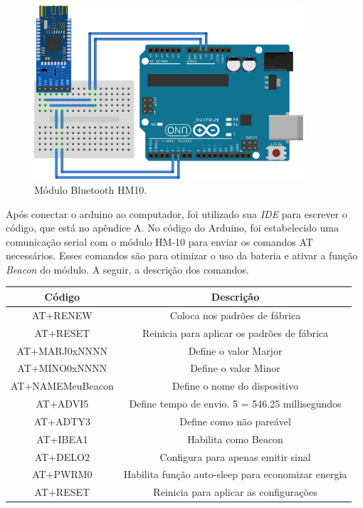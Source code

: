\documentclass[
	12pt,				%
	oneside,			%
	a4paper,			%
	brazil				%
]{abntex2}
\begin{document}
\begin{figure}[!h]
\centering
\includegraphics[width=10cm, center]{images/arduino-hm10}
\caption{Módulo Bluetooth HM10.}
\label{Rotulo}
\end{figure}

Após conectar o arduino ao computador, foi utilizado sua \textit{IDE} para escrever o código, que está no apêndice A. No código do Arduino, foi estabelecido uma comunicação serial com o módulo HM-10 para enviar os comandos AT necessários. Esses comandos são para otimizar o uso da bateria e ativar a função \textit{Beacon} do módulo. A seguir, a descrição dos comandos.

\begin{tabular}{|c|c|}
\hline 
Código & Descrição \\ 
\hline 
AT+RENEW & Coloca nos padrões de fábrica \\ 
\hline 
AT+RESET & Reinicia para aplicar os padrões de fábrica \\ 
\hline 
AT+MARJ0xNNNN & Define o valor Marjor \\ 
\hline 
AT+MINO0xNNNN & Define o valor Minor \\ 
\hline 
AT+NAMEMeuBeacon & Define o nome do dispositivo \\ 
\hline 
AT+ADVI5 & Define tempo de envio. 5 = 546.25 millisegundos \\ 
\hline 
AT+ADTY3 & Define como não pareável \\ 
\hline 
AT+IBEA1 & Habilita como Beacon \\ 
\hline 
AT+DELO2 & Configura para apenas emitir sinal \\ 
\hline 
AT+PWRM0 & Habilita função auto-sleep para economizar energia \\ 
\hline 
AT+RESET & Reinicia para aplicar as configurações \\ 
\hline 
\end{tabular} 
\end{document}
